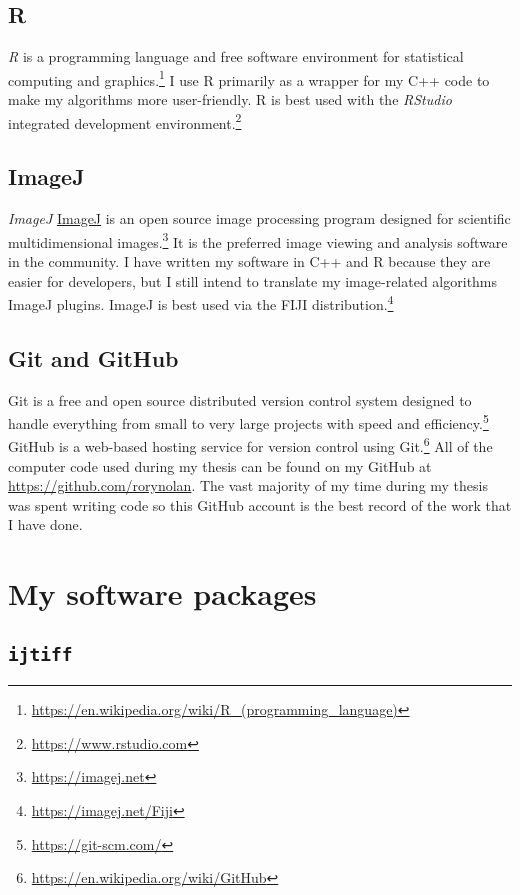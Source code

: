\documentclass[12pt,]{book}
\let\rmarkdownfootnote\footnote%
\def\footnote{\protect\rmarkdownfootnote}
\theoremstyle{definition}
\theoremstyle{definition}
\theoremstyle{definition}
\theoremstyle{remark}
\begin{document}
\subsection{R}\label{r}

\emph{R} \citep{R} is a programming language and free software
environment for statistical computing and graphics.\footnote{\url{https://en.wikipedia.org/wiki/R_(programming_language)}}
I use R primarily as a wrapper for my C++ code to make my algorithms
more user-friendly. R is best used with the \emph{RStudio} integrated
development environment.\footnote{\url{https://www.rstudio.com}}

\hypertarget{imagej}{\subsection{ImageJ}\label{imagej}}

\emph{ImageJ} \protect\hyperlink{imagej}{ImageJ} is an open source image
processing program designed for scientific multidimensional
images.\footnote{\url{https://imagej.net}} It is the preferred image
viewing and analysis software in the community. I have written my
software in C++ and R because they are easier for developers, but I
still intend to translate my image-related algorithms ImageJ plugins.
ImageJ is best used via the FIJI \citep{FIJI} distribution.\footnote{\url{https://imagej.net/Fiji}}

\subsection{Git and GitHub}\label{git-and-github}

Git is a free and open source distributed version control system
designed to handle everything from small to very large projects with
speed and efficiency.\footnote{\url{https://git-scm.com/}} GitHub is a
web-based hosting service for version control using Git.\footnote{\url{https://en.wikipedia.org/wiki/GitHub}}
All of the computer code used during my thesis can be found on my GitHub
at \url{https://github.com/rorynolan}. The vast majority of my time
during my thesis was spent writing code so this GitHub account is the
best record of the work that I have done.

\section{My software packages}\label{my-software-packages}

\subsection{\texorpdfstring{\texttt{ijtiff}}{ijtiff}}\label{ijtiff}
\end{document}
